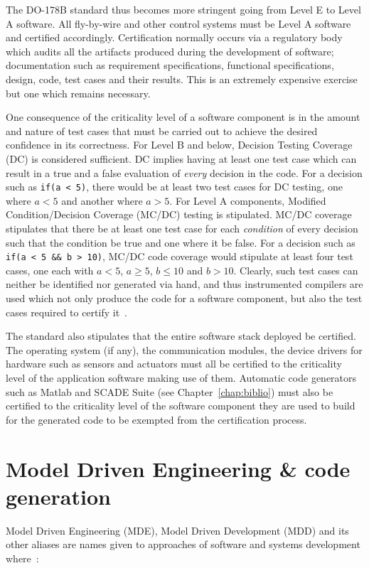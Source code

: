 The DO-178B standard thus becomes more stringent going from Level E to
Level A software. All fly-by-wire and other control systems must be
Level A software and certified accordingly. Certification normally
occurs via a regulatory body which audits all the artifacts produced
during the development of software; documentation such as requirement
specifications, functional specifications, design, code, test cases
and their results. This is an extremely expensive exercise but one
which remains necessary.

One consequence of the criticality level of a software component is in
the amount and nature of test cases that must be carried out to
achieve the desired confidence in its correctness. For Level B and
below, Decision Testing Coverage (DC) is considered sufficient. DC
implies having at least one test case which can result in a true and a
false evaluation of \emph{every} decision in the code. For a decision
such as \texttt{if(a < 5)}, there would be at least two test cases for
DC testing, one where $a < 5$ and another where $a > 5$. For Level A
components, Modified Condition/Decision Coverage (MC/DC) testing is
stipulated. MC/DC coverage stipulates that there be at least one test
case for each \emph{condition} of every decision such that the
condition be true and one where it be false. For a decision such as
\texttt{if(a < 5 \&\& b > 10)}, MC/DC code coverage would stipulate at
least four test cases, one each with $a < 5$, $a \ge 5$, $b \le 10$
and $b > 10$. Clearly, such test cases can neither be identified nor
generated via hand, and thus instrumented compilers are used which not
only produce the code for a software component, but also the test
cases required to certify it~\cite{gasperoni@ae02}.

The standard also stipulates that the entire software stack deployed
be certified. The operating system (if any), the communication
modules, the device drivers for hardware such as sensors and actuators
must all be certified to the criticality level of the application
software making use of them. Automatic code generators such as Matlab
\simu and SCADE Suite (see Chapter~\ref{chap:biblio})
must also be certified to the criticality level of the software
component they are used to build for the generated code to be exempted
from the certification process.

\section{Model Driven Engineering \& code generation}
Model Driven Engineering (MDE), Model Driven Development (MDD) and its
other aliases are names given to approaches of software and systems
development where~\cite{france@fose07}:

